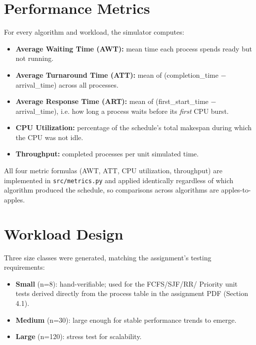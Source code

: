 \documentclass[11pt]{article}
\begin{document}
\section{Performance Metrics}

For every algorithm and workload, the simulator computes:

\begin{itemize}
  \item \textbf{Average Waiting Time (AWT):} mean time each process spends
    ready but not running.
  \item \textbf{Average Turnaround Time (ATT):} mean of
    (completion\_time $-$ arrival\_time) across all processes.
  \item \textbf{Average Response Time (ART):} mean of
    (first\_start\_time $-$ arrival\_time), i.e. how long a process waits
    before its \emph{first} CPU burst.
  \item \textbf{CPU Utilization:} percentage of the schedule's total
    makespan during which the CPU was not idle.
  \item \textbf{Throughput:} completed processes per unit simulated time.
\end{itemize}

All four metric formulas (AWT, ATT, CPU utilization, throughput) are
implemented in \texttt{src/metrics.py} and applied identically regardless
of which algorithm produced the schedule, so comparisons across algorithms
are apples-to-apples.

\section{Workload Design}
\label{sec:workloads}

Three size classes were generated, matching the assignment's testing
requirements:

\begin{itemize}
  \item \textbf{Small} (n=8): hand-verifiable; used for the FCFS/SJF/RR/
    Priority unit tests derived directly from the process table in the
    assignment PDF (Section 4.1).
  \item \textbf{Medium} (n=30): large enough for stable performance trends
    to emerge.
  \item \textbf{Large} (n=120): stress test for scalability.
\end{itemize}
\end{document}
